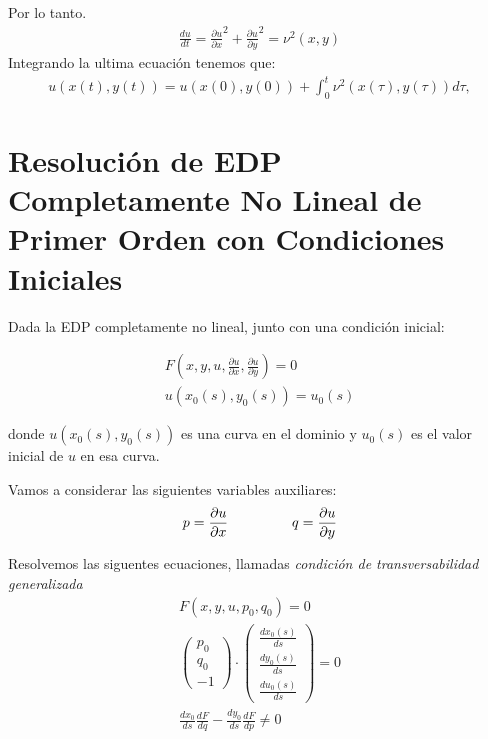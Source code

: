 \documentclass[11pt]{book}
\theoremstyle{plain}
\theoremstyle{definition}
\begin{document}
Por lo tanto.
\begin{align*}
    \frac{du}{dt} = \frac{\partial u}{\partial x} ^{2} + \frac{\partial u}{\partial y} ^{2} = \nu^{2}(x,y)
\end{align*}
Integrando la ultima ecuación tenemos que:
\begin{align}
    u(x(t), y(t)) = u(x(0), y(0)) + \int_{0}^{t} \nu^{2}(x(\tau), y(\tau)) d\tau,
\end{align}

\section{Resolución de EDP Completamente No Lineal de Primer Orden con Condiciones Iniciales}

Dada la EDP completamente no lineal, junto con una condición inicial:

\setcounter{equation}{0}
\begin{align}
    F(x, y, u, \frac{\partial u}{\partial x}, \frac{\partial u}{\partial y}) = 0 \\
    u(x_0(s), y_0(s)) = u_0(s)
\end{align}

donde \(u(x_0(s), y_0(s))\) es una curva en el dominio y \(u_0(s)\) es el valor inicial de \(u\) en esa curva.

Vamos a considerar las siguientes variables auxiliares:
\begin{align}
    p = \frac{\partial u}{\partial x} \hspace{16mm} q = \frac{\partial u}{\partial y}
\end{align}

Resolvemos las siguentes ecuaciones, llamadas \emph{condición de transversabilidad generalizada}
\begin{align}
    F(x, y, u, p_0, q_0) = 0 \\
    \begin{pmatrix}
        p_0 \\ q_0 \\ -1
    \end{pmatrix}
    \cdot
    \begin{pmatrix}
        \frac{d x_0(s)}{ds} \\ \frac{d y_0(s)}{ds} \\ \frac{d u_0(s)}{ds}
    \end{pmatrix} = 0 \\
    \frac{d x_0}{ds}\frac{d F}{dq} - \frac{d y_0}{ds}\frac{d F}{dp} \neq 0
\end{align}
\end{document}
